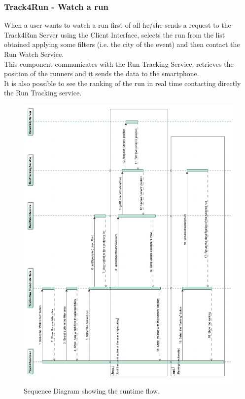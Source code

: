 \documentclass[a4paper]{article}
\begin{document}
\subsubsection{Track4Run - Watch a run}
When a user wants to watch a run first of all he/she sends a request to the Track4Run Server using the Client Interface, selects the run from the list obtained applying some filters (i.e. the city of the event) and then contact the Run Watch Service. \\
This component communicates with the Run Tracking Service, retrieves the position of the runners and it sends the data to the smartphone. \\
It is also possible to see the ranking of the run in real time contacting directly the Run Tracking service.

\begin{figure}[H]
    \centering
    \includegraphics[width=\linewidth]{SequenceDiagram-SpectateARunEvent}
    \caption{Sequence Diagram showing the runtime flow.}
    \label{fig:my_label}
\end{figure}
\clearpage
\end{document}
